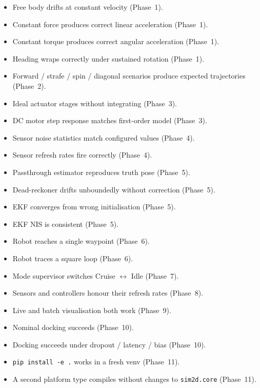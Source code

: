 \documentclass[11pt,a4paper]{article}
\newcommand{\code}[1]{\texttt{\small #1}}
\begin{document}
\begin{itemize}[leftmargin=2em]
    \item[$\square$] Free body drifts at constant velocity (Phase~1).
    \item[$\square$] Constant force produces correct linear acceleration (Phase~1).
    \item[$\square$] Constant torque produces correct angular acceleration (Phase~1).
    \item[$\square$] Heading wraps correctly under sustained rotation (Phase~1).
    \item[$\square$] Forward / strafe / spin / diagonal scenarios produce expected trajectories (Phase~2).
    \item[$\square$] Ideal actuator stages without integrating (Phase~3).
    \item[$\square$] DC motor step response matches first-order model (Phase~3).
    \item[$\square$] Sensor noise statistics match configured values (Phase~4).
    \item[$\square$] Sensor refresh rates fire correctly (Phase~4).
    \item[$\square$] Passthrough estimator reproduces truth pose (Phase~5).
    \item[$\square$] Dead-reckoner drifts unboundedly without correction (Phase~5).
    \item[$\square$] EKF converges from wrong initialisation (Phase~5).
    \item[$\square$] EKF NIS is consistent (Phase~5).
    \item[$\square$] Robot reaches a single waypoint (Phase~6).
    \item[$\square$] Robot traces a square loop (Phase~6).
    \item[$\square$] Mode supervisor switches Cruise $\leftrightarrow$ Idle (Phase~7).
    \item[$\square$] Sensors and controllers honour their refresh rates (Phase~8).
    \item[$\square$] Live and batch visualisation both work (Phase~9).
    \item[$\square$] Nominal docking succeeds (Phase~10).
    \item[$\square$] Docking succeeds under dropout / latency / bias (Phase~10).
    \item[$\square$] \code{pip install -e .} works in a fresh venv (Phase~11).
    \item[$\square$] A second platform type compiles without changes to \code{sim2d.core} (Phase~11).
\end{itemize}
\end{document}
